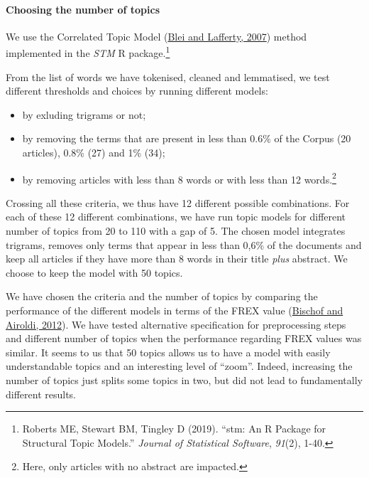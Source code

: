 \documentclass[
]{article}
\providecommand{\tightlist}{%
  \setlength{\itemsep}{0pt}\setlength{\parskip}{0pt}}
\begin{document}
\hypertarget{choosing-the-number-of-topics}{%
\paragraph*{Choosing the number of
topics}\label{choosing-the-number-of-topics}}

We use the Correlated Topic Model (\protect\hyperlink{ref-blei2007}{Blei
and Lafferty, 2007}) method implemented in the \emph{STM} R
package.\footnote{Roberts ME, Stewart BM, Tingley D (2019). ``stm: An R
  Package for Structural Topic Models.'' \emph{Journal of Statistical
  Software}, \emph{91}(2), 1-40.}

From the list of words we have tokenised, cleaned and lemmatised, we
test different thresholds and choices by running different models:

\begin{itemize}
\tightlist
\item
  by exluding trigrams or not;
\item
  by removing the terms that are present in less than 0.6\% of the
  Corpus (20 articles), 0.8\% (27) and 1\% (34);
\item
  by removing articles with less than 8 words or with less than 12
  words.\footnote{Here, only articles with no abstract are impacted.}
\end{itemize}

Crossing all these criteria, we thus have 12 different possible
combinations. For each of these 12 different combinations, we have run
topic models for different number of topics from 20 to 110 with a gap of
5. The chosen model integrates trigrams, removes only terms that appear
in less than 0,6\% of the documents and keep all articles if they have
more than 8 words in their title \emph{plus} abstract. We choose to keep
the model with 50 topics.

We have chosen the criteria and the number of topics by comparing the
performance of the different models in terms of the FREX value
(\protect\hyperlink{ref-bischof2012}{Bischof and Airoldi, 2012}). We
have tested alternative specification for preprocessing steps and
different number of topics when the performance regarding FREX values
was similar. It seems to us that 50 topics allows us to have a model
with easily understandable topics and an interesting level of ``zoom''.
Indeed, increasing the number of topics just splits some topics in two,
but did not lead to fundamentally different results.
\end{document}
